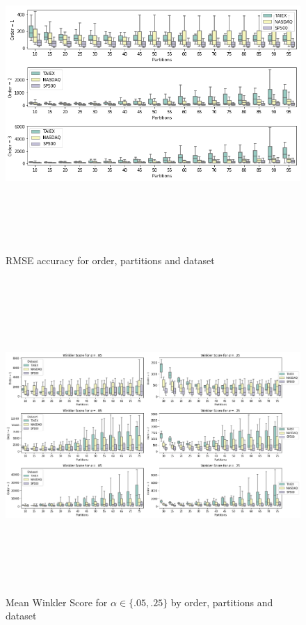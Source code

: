 \begin{figure}[htb]
    \centering
    \includegraphics[width=\textwidth,height=12cm]{figures/pwfts_gridsearch_point.png}
    \caption{RMSE accuracy for order, partitions and dataset}
    \label{fig:pwfts_gridsearch_point}
\end{figure}

\begin{figure}[htb]
    \centering
    \includegraphics[width=\textwidth,height=12cm]{figures/pwfts_gridsearch_interval.png}
    \caption{Mean Winkler Score for $\alpha \in \{.05,.25\}$ by order, partitions and dataset}
    \label{fig:pwfts_gridsearch_interval}
\end{figure}

